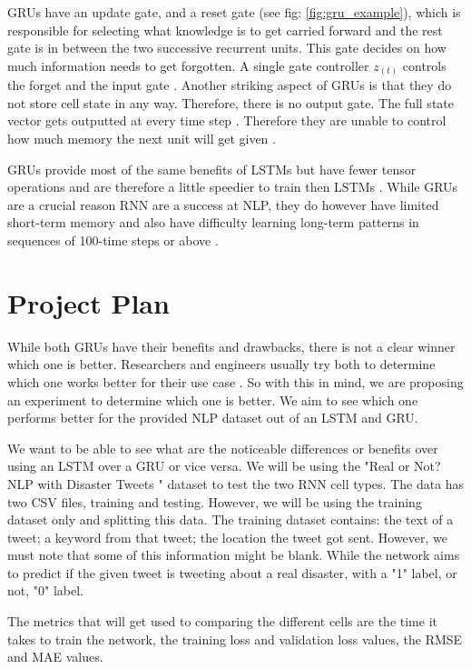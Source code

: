 \documentclass[a4paper,10pt]{article}
\begin{document}
	GRUs have an update gate, and a reset gate (see fig: \ref{fig:gru_example}), which is responsible for selecting what knowledge is to get carried forward and the rest gate is in between the two successive recurrent units. This gate decides on how much information needs to get forgotten. A single gate controller $z_{(t)}$ controls the forget and the input gate \cite{geron2019hands}.  Another striking aspect of GRUs is that they do not store cell state in any way. Therefore, there is no output gate. The full state vector gets outputted at every time step \cite{geron2019hands}. Therefore they are unable to control how much memory the next unit will get given \cite{g4g}.  
	
	GRUs provide most of the same benefits of LSTMs but have fewer tensor operations and are therefore a little speedier to train then LSTMs \cite{illustrated_lstm_gru}. While GRUs are a crucial reason RNN are a success at NLP, they do however have limited short-term memory and also have difficulty learning long-term patterns in sequences of 100-time steps or above \cite{geron2019hands}.


\section{Project Plan}
\label{sec:project_plan}

	While both GRUs have their benefits and drawbacks, there is not a clear winner which one is better. Researchers and engineers usually try both to determine which one works better for their use case \cite{illustrated_lstm_gru}. So with this in mind, we are proposing an experiment to determine which one is better. We aim to see which one performs better for the provided NLP dataset out of an LSTM and GRU.
	
	We want to be able to see what are the noticeable differences or benefits over using an LSTM over a GRU or vice versa. We will be using the "Real or Not? NLP with Disaster Tweets \cite{disater_kaggle}" dataset to test the two RNN cell types.  The data has two CSV files, training and testing. However, we will be using the training dataset only and splitting this data.
	The training dataset contains: the text of a tweet; a keyword from that tweet; the location the tweet got sent. However, we must note that some of this information might be blank. While the network aims to predict if the given tweet is tweeting about a real disaster, with a "1" label, or not, "0" label. 
	
	The metrics that will get used to comparing the different cells are the time it takes to train the network, the training loss and validation loss values, the RMSE and MAE values.
	
	
\medskip
\newpage
	
	




\end{document}
